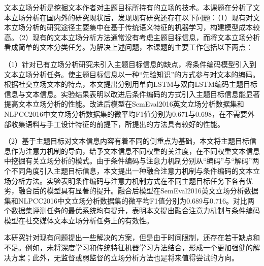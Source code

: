 

文本立场分析是挖掘文本作者对主题目标所持有的立场的技术。本课题在分析了文本立场分析在国内外的研究现状后，发现现有研究还存在以下问题：（1）现有对文本立场分析的研究途径主要集中在基于传统语义特征的机器学习，构建模型成本较高。（2）现有的文本立场分析方法通常没有考虑主题目标信息，而将文本立场分析看成简单的文本分类任务。为解决上述问题，本课题的主要工作包括以下两点：

（1）针对已有立场分析研究未引入主题目标信息的缺点，将条件编码模型引入到文本立场分析任务。使主题目标信息以一种“先验知识”的方式参与对文本的编码。根据社交立场文本的特点，本文提出分别用单向LSTM与双向LSTM编码主题目标信息与文本信息。实验结果表明以改进后条件编码的方式引入主题目标信息能显著提高文本立场分析的性能。改进后模型在SemEval2016英文立场分析数据集和NLPCC2016中文立场分析数据集的微平均F1值分别为0.671与0.698，在不需要外部收集语料与手工设计特征的前提下，所提出的方法具有较好的性能。

（2）基于主题目标对文本信息内容有着不同的侧重点为基础，本文将主题目标信息作为注意力机制的导向，给予文本信息不同权重的关注度，在不同权重文本信息中挖掘有关立场分析的模式。由于条件编码与注意力机制分别从“编码”与“解码”两个不同角度引入主题目标信息，本文提出一种融合注意力机制与条件编码的文本立场分析方法。实验表明条件编码与注意力机制方式在不同主题目标任务下各有优劣，融合后的模型具有显著的提升。融合后模型在SemEval2016英文立场分析数据集和NLPCC2016中文立场分析数据集的微平均F1值分别为0.689与0.716。对比两个数据集评测任务的最优系统均有提升，表明本文提出融合注意力机制与条件编码模型在社交媒体文本立场分析任务上的有效性。

本研究针对现有问题提出一些解决的方案，但是由于时间限制，还存在若干缺点和不足。例如，未将深度学习和传统特征机器学习方法结合，形成一个更加强健的解决方案；此外，无监督或弱监督的立场分析方法也是将来值得尝试的方向。